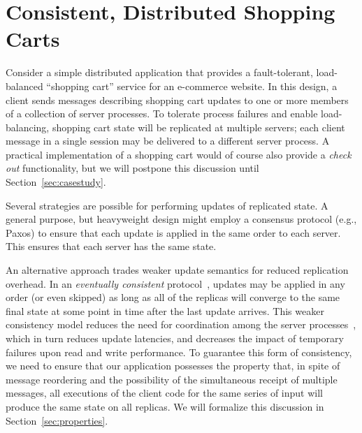 \section{Consistent, Distributed Shopping Carts}
\label{sec:motivation}

Consider a simple distributed application that provides a fault-tolerant, load-balanced
``shopping cart'' service for an e-commerce website. In this design, a client
sends messages describing shopping cart updates to one or more members of a collection of server
processes. To tolerate process failures and enable load-balancing, shopping cart state will be replicated
at multiple servers; each client message in a single session may be delivered to a different server process.  A practical implementation of a shopping cart would of course also
provide a {\em check out} functionality, but we will postpone this discussion until
Section~\ref{sec:casestudy}.


Several strategies are possible for performing updates of replicated state. A
general purpose, but heavyweight design might employ a consensus protocol (e.g., Paxos\cite{part-time})
to ensure that each update is applied in the same order to each server. This
ensures that each server has the same state.

An alternative approach trades weaker update semantics for reduced
replication overhead.  In an {\em eventually consistent}
protocol~\cite{quicksand,beyond}, updates may be applied in any order
(or even skipped) as long as all of the replicas will converge to the
same final state at some point in time after the last update arrives.
This weaker consistency model reduces the need for coordination among
the server processes~\cite{dynamo}, which in turn reduces update
latencies, and decreases the impact of temporary failures upon read and
write performance.  To guarantee this form of consistency, we need to ensure that our application possesses the 
property that, in spite of message reordering and the possibility of the simultaneous
receipt of multiple messages, all executions of the client code for the same series of
input will produce the same state on all replicas.  We will formalize this discussion in
Section~\ref{sec:properties}.



